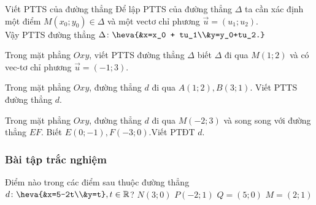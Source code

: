 \begin{dang}{Viết PTTS của đường thẳng}
	Để lập PTTS của đường thẳng $\Delta$ ta cần xác định một điểm $M \left(x_0; y_0 \right) \in \Delta$ và một vectơ chỉ phương $ \overrightarrow{u} = \left(u_1; u_2 \right)$.\\
	Vậy PTTS đường thẳng $\Delta \colon \heva{&x=x_0 + tu_1\\&y=y_0+tu_2.}$
\end{dang}
\viduminhhoa
\begin{vd}%
	Trong mặt phẳng $Oxy$, viết PTTS đường thẳng $\Delta$ biết $\Delta$ đi qua $M(1;2)$ và có vec-tơ chỉ phương $ \overrightarrow{u} = (-1;3)$.
\end{vd}
\begin{vd}%
	Trong mặt phẳng $Oxy$, đường thẳng $d$ đi qua $A \left(1; 2 \right), B \left(3;1 \right)$. Viết PTTS đường thẳng $d$.
\end{vd}
\begin{vd}%
	Trong mặt phẳng $Oxy$, đường thẳng $d$ đi qua $M(-2;3)$ và song song với đường thẳng $EF$. Biết $E(0;-1), F(-3;0)$.Viết PTĐT $d$.
\end{vd}
\subsubsection{Bài tập trắc nghiệm} 

\begin{ex}%
	Điểm nào trong các điểm sau thuộc đường thẳng $d\colon \heva{&x=5-2t\\&y=t}, t\in \mathbb{R}$?
	\choice
	{$N(3;0) $}
	{$P(-2;1) $}
	{\True $Q=(5;0) $}
	{$M=(2;1) $}
\end{ex}

